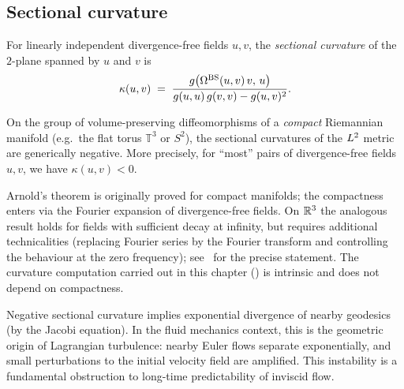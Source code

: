 \subsection{Sectional curvature}

\begin{definition}\label{def:sectional-curv}
  For linearly independent divergence-free fields $u, v$, the \emph{sectional curvature}
  of the $2$-plane spanned by $u$ and $v$ is
  \begin{equation}\label{eq:sectional-curv}
    \kappa(u, v)
    \;=\; \frac{g\bigl(\Omega^{\mathrm{BS}}(u,v)\,v,\, u\bigr)}{g(u,u)\,g(v,v) - g(u,v)^2}.
  \end{equation}
\end{definition}

\begin{theorem}\label{thm:arnold-curvature}
  On the group of volume-preserving diffeomorphisms of a \emph{compact} Riemannian
  manifold (e.g.\ the flat torus $\mathbb{T}^3$ or $S^2$), the sectional curvatures of
  the $L^{2}$ metric are generically negative.  More precisely, for ``most'' pairs of
  divergence-free fields $u, v$, we have $\kappa(u, v) < 0$.
\end{theorem}

\begin{remark}[Extension to $\R^3$]
  Arnold's theorem is originally proved for compact manifolds; the compactness enters via
  the Fourier expansion of divergence-free fields.  On $\R^3$ the analogous result holds
  for fields with sufficient decay at infinity, but requires additional technicalities
  (replacing Fourier series by the Fourier transform and controlling the behaviour at the
  zero frequency); see~\cite{arnoldKhesin1998} for the precise statement.  The curvature
  computation carried out in this chapter () is intrinsic and does
  not depend on compactness.
\end{remark}

\begin{remark}
  Negative sectional curvature implies exponential divergence of nearby geodesics (by the
  Jacobi equation).  In the fluid mechanics context, this is the geometric origin of
  Lagrangian turbulence: nearby Euler flows separate exponentially, and small perturbations
  to the initial velocity field are amplified.  This instability is a fundamental obstruction
  to long-time predictability of inviscid flow.
\end{remark}

